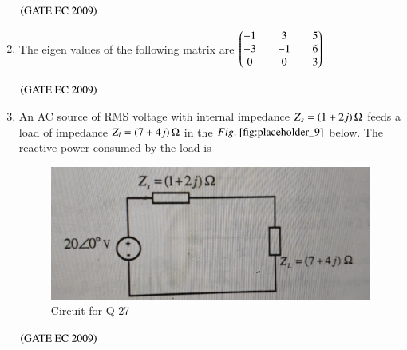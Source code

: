 \documentclass[journal,12pt,onecolumn]{IEEEtran}
\theoremstyle{remark}
\begin{document}
\begin{enumerate}[start=1, label={Q\arabic*.}]
\begin{enumerate}
\end{enumerate}
\hfill $\left(\text{GATE EC 2009}\right)$

\item The eigen values of the following matrix are 
$\begin{pmatrix}-1&&3&&5 \\ -3&&-1&&6 \\ 0 && 0 && 3\end{pmatrix}$
\begin{enumerate}
\end{enumerate}
\hfill $\left(\text{GATE EC 2009}\right)$

\item An AC source of RMS voltage with internal impedance $Z_s = \left(1+2j\right) \ohm$ feeds a load of impedance $Z_l = \left(7+4j\right) \ohm$ in the $\figref{fig:placeholder_9}$ below. The reactive power consumed by the load is 
\begin{figure}[H]
    \centering
    \includegraphics[width=0.5\columnwidth]{figs/fig_9.jpg}
    \caption{\centering Circuit for Q-27}
    \label{fig:placeholder_9}
\end{figure}
\begin{enumerate}
\end{enumerate}
\hfill $\left(\text{GATE EC 2009}\right)$


\end{enumerate}
\end{document}
